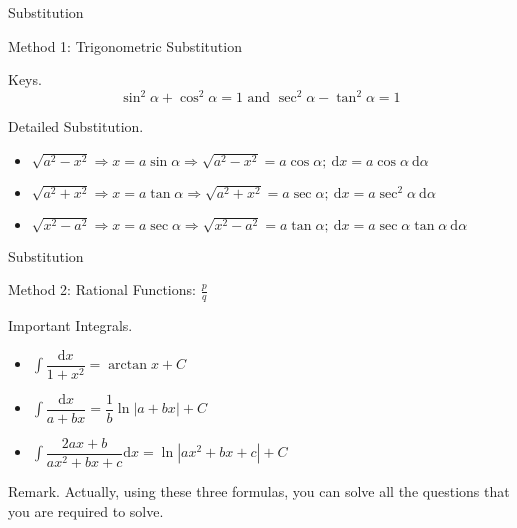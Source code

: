 \documentclass{beamer}
\begin{document}
    \begin{frame}[t]{Substitution}
        \begin{block}{Method 1: Trigonometric Substitution}
            \par \textcolor{yy}{Keys.}
            \begin{equation*}
                \sin^2\alpha + \cos^2\alpha = 1 \text{ and } 
                \sec^2\alpha - \tan^2\alpha = 1
            \end{equation*}
            \par \textcolor{yy}{Detailed Substitution.}
            \begin{itemize}
                \item $\sqrt{a^2-x^2}\Rightarrow x=a\sin \alpha\Rightarrow \sqrt{a^2-x^2}=a\cos \alpha;\ \mathrm{d}x=a\cos\alpha\ \mathrm{d}\alpha$
                \item $\sqrt{a^2+x^2}\Rightarrow x=a\tan \alpha\Rightarrow \sqrt{a^2+x^2}=a\sec \alpha;\ \mathrm{d}x=a\sec^2\alpha\ \mathrm{d}\alpha$
                \item $\sqrt{x^2-a^2}\Rightarrow x=a\sec \alpha\Rightarrow \sqrt{x^2-a^2}=a\tan \alpha;\ \mathrm{d}x=a\sec\alpha\tan\alpha\ \mathrm{d}\alpha$
            \end{itemize}
        \end{block}
    \end{frame}

    \begin{frame}[t]{Substitution}
        \begin{block}{Method 2: Rational Functions: $\frac{p}{q}$}
            \par \textcolor{yy}{Important Integrals.}
            \begin{itemize}
                \item $\int \dfrac{\mathrm{d}x}{1+x^2}=\arctan x+C$
                \item $\int \dfrac{\mathrm{d}x}{a+bx}=\dfrac{1}{b}\ln\left|a+bx\right|+C$
                \item $\int \dfrac{2ax+b}{ax^2+bx+c}\mathrm{d}x=\ln\left|ax^2+bx+c\right|+C$
            \end{itemize}
        \end{block}
        \par \textcolor{yy}{Remark.} Actually, using these three 
        formulas, you can solve all the questions that you are required to solve.
    \end{frame}
\end{document}
